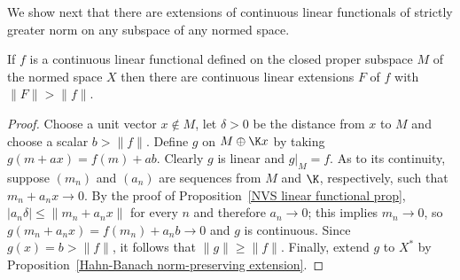 We show next that there are extensions of continuous linear functionals of strictly greater norm on any subspace of any normed space.
\begin{proposition}\label{NVS linear functional increase norm}
If $f$ is a continuous linear functional defined on the closed proper subspace $M$ of the normed space $X$ then there are continuous linear extensions $F$ of $f$ with $\|F\|>\|f\|$.
\end{proposition}
\begin{proof}
Choose a unit vector $x\notin M$, let $\delta>0$ be the distance from $x$ to $M$ and choose a scalar $b>\|f\|$. Define $g$ on $M\oplus\K x$ by taking $g(m+ax)=f(m)+ab$. Clearly $g$ is linear and $g|_M=f$. As to its continuity, suppose $(m_n)$ and $(a_n)$ are sequences from $M$ and $\K$, respectively, such that $m_n+a_nx\to 0$. By the proof of Proposition~\ref{NVS linear functional prop}, $|a_n\delta|\leq\|m_n+a_nx\|$ for every $n$ and therefore $a_n\to 0$; this implies $m_n\to 0$, so $g(m_n+a_nx)=f(m_n)+a_nb\to 0$ and $g$ is continuous. Since $g(x)=b>\|f\|$, it follows that $\|g\|\geq\|f\|$. Finally, extend $g$ to $X^*$ by Proposition~\ref{Hahn-Banach norm-preserving extension}.
\end{proof}

